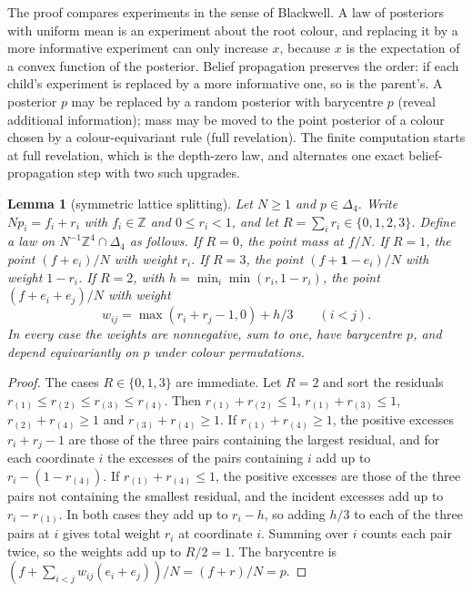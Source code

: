 \documentclass[11pt]{amsart}
\newtheorem{lemma}[theorem]{Lemma}
\theoremstyle{definition}
\theoremstyle{remark}
\newcommand{\Simp}{\Delta_4}
\newcommand{\one}{\mathbf{1}}
\begin{document}
The proof compares experiments in the sense of Blackwell. A law of posteriors with uniform mean is an
experiment about the root colour, and replacing it by a more informative experiment can only increase
$x$, because $x$ is the expectation of a convex function of the posterior. Belief propagation preserves
the order: if each child's experiment is replaced by a more informative one, so is the parent's. A
posterior $p$ may be replaced by a random posterior with barycentre $p$ (reveal additional
information); mass may be moved to the point posterior of a colour chosen by a colour-equivariant
rule (full revelation). The finite computation starts at full revelation, which is the depth-zero
law, and alternates one exact belief-propagation step with two such upgrades.

\begin{lemma}[symmetric lattice splitting]\label{lem:split}
Let $N\ge1$ and $p\in\Simp$. Write $Np_i=f_i+r_i$ with $f_i\in\mathbb Z$ and $0\le r_i<1$, and let
$R=\sum_ir_i\in\{0,1,2,3\}$. Define a law on $N^{-1}\mathbb Z^4\cap\Simp$ as follows. If $R=0$, the
point mass at $f/N$. If $R=1$, the point $(f+e_i)/N$ with weight $r_i$. If $R=3$, the point
$(f+\one-e_i)/N$ with weight $1-r_i$. If $R=2$, with $h=\min_i\min(r_i,1-r_i)$, the point
$(f+e_i+e_j)/N$ with weight
\[
w_{ij}=\max(r_i+r_j-1,0)+h/3\qquad(i<j).
\]
In every case the weights are nonnegative, sum to one, have barycentre $p$, and depend equivariantly
on $p$ under colour permutations.
\end{lemma}

\begin{proof}
The cases $R\in\{0,1,3\}$ are immediate. Let $R=2$ and sort the residuals $r_{(1)}\le r_{(2)}\le
r_{(3)}\le r_{(4)}$. Then $r_{(1)}+r_{(2)}\le1$, $r_{(1)}+r_{(3)}\le1$, $r_{(2)}+r_{(4)}\ge1$ and
$r_{(3)}+r_{(4)}\ge1$. If $r_{(1)}+r_{(4)}\ge1$, the positive excesses $r_i+r_j-1$ are those of the
three pairs containing the largest residual, and for each coordinate $i$ the excesses of the pairs
containing $i$ add up to $r_i-(1-r_{(4)})$. If $r_{(1)}+r_{(4)}\le1$, the positive excesses are those
of the three pairs not containing the smallest residual, and the incident excesses add up to
$r_i-r_{(1)}$. In both cases they add up to $r_i-h$, so adding $h/3$ to each of the three pairs at $i$
gives total weight $r_i$ at coordinate $i$. Summing over $i$ counts each pair twice, so the weights add
up to $R/2=1$. The barycentre is $(f+\sum_{i<j}w_{ij}(e_i+e_j))/N=(f+r)/N=p$.
\end{proof}
\end{document}
